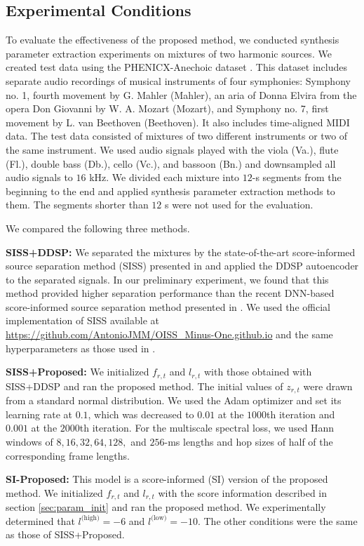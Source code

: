 \documentclass{article}
\begin{document}
\subsection{Experimental Conditions}
To evaluate the effectiveness of the proposed method, we conducted synthesis parameter extraction experiments on mixtures of two harmonic sources.
We created test data using the PHENICX-Anechoic dataset \cite{gakuhukouka3,testdata2}.
This dataset includes separate audio recordings of musical instruments of four symphonies: Symphony no. 1, fourth movement by G. Mahler (Mahler), an aria of Donna Elvira from the opera Don Giovanni by W. A. Mozart (Mozart), and Symphony no. 7, first movement by L. van Beethoven (Beethoven).
It also includes time-aligned MIDI data.
The test data consisted of mixtures of two different instruments or two of the same instrument.
We used audio signals played with the viola (Va.), flute (Fl.), double bass (Db.), cello (Vc.), and bassoon (Bn.) and downsampled all audio signals to $16$ kHz.
We divided each mixture into $12$-s segments from the beginning to the end and applied synthesis parameter extraction methods to them.
The segments shorter than $12$ s were not used for the evaluation.

We compared the following three methods.

\noindent\textbf{SISS+DDSP:}
We separated the mixtures by the state-of-the-art score-informed source separation method (SISS) presented in \cite{simsd} and applied the DDSP autoencoder to the separated signals.
In our preliminary experiment, we found that this method provided higher separation performance than the recent DNN-based score-informed source separation method presented in \cite{si_dnn}.
We used the official implementation of SISS available at \url{https://github.com/AntonioJMM/OISS_Minus-One.github.io} and the same hyperparameters as those used in \cite{simsd}.

\noindent\textbf{SISS+Proposed:}
We initialized $f_{r,t}$ and $l_{r,t}$ with those obtained with SISS+DDSP and ran the proposed method.
The initial values of $z_{r,t}$ were drawn from a standard normal distribution.
We used the Adam optimizer and set its learning rate at $0.1$, which was decreased to $0.01$ at the $1000$th iteration and $0.001$ at the $2000$th iteration.
For the multiscale spectral loss, we used Hann windows of $8, 16, 32, 64, 128,$ and $256$-ms lengths and hop sizes of half of the corresponding frame lengths.

\noindent\textbf{SI-Proposed:}
This model is a score-informed (SI) version of the proposed method. We initialized $f_{r,t}$ and $l_{r,t}$ with the score information described in section \ref{sec:param_init} and ran the proposed method.
We experimentally determined that $l^{\text{(high)}}=-6$ and $l^{\text{(low)}}=-10$. The other conditions were the same as those of SISS+Proposed.
\end{document}
